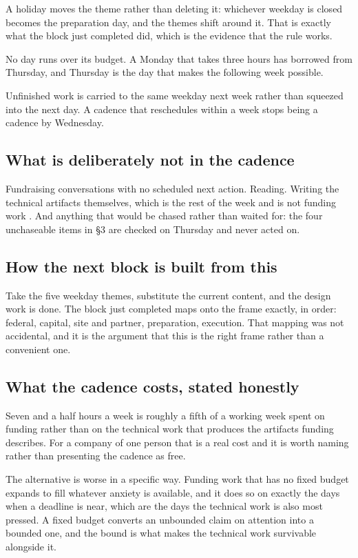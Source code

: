 A holiday moves the theme rather than deleting it: whichever weekday is closed
becomes the preparation day, and the themes shift around it. That is exactly what
the block just completed did, which is the evidence that the rule works.

No day runs over its budget. A Monday that takes three hours has borrowed from
Thursday, and Thursday is the day that makes the following week possible.

Unfinished work is carried to the same weekday next week rather than squeezed
into the next day. A cadence that reschedules within a week stops being a cadence
by Wednesday.

\subsection{What is deliberately not in the cadence}

Fundraising conversations with no scheduled next action. Reading. Writing the
technical artifacts themselves, which is the rest of the week and is not funding
work \cite{capitalplan2026}. And anything that would be chased rather than waited
for: the four unchaseable items in \S3 are checked on Thursday and never acted
on.

\subsection{How the next block is built from this}

Take the five weekday themes, substitute the current content, and the design work
is done. The block just completed maps onto the frame exactly, in order: federal,
capital, site and partner, preparation, execution. That mapping was not
accidental, and it is the argument that this is the right frame rather than a
convenient one.

\subsection{What the cadence costs, stated honestly}

Seven and a half hours a week is roughly a fifth of a working week spent on
funding rather than on the technical work that produces the artifacts funding
describes. For a company of one person that is a real cost and it is worth
naming rather than presenting the cadence as free.

The alternative is worse in a specific way. Funding work that has no fixed budget
expands to fill whatever anxiety is available, and it does so on exactly the days
when a deadline is near, which are the days the technical work is also most
pressed. A fixed budget converts an unbounded claim on attention into a bounded
one, and the bound is what makes the technical work survivable alongside it.


